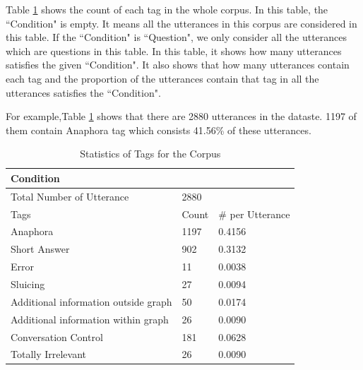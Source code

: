 \documentclass[bsc,frontabs,twoside,singlespacing,parskip,deptreport]{infthesis}     %
\begin{document}
Table \ref{tab:ori} shows the count of each tag in the whole corpus. In this table, the ``Condition" is empty. It means all the utterances in this corpus are considered in this table. If the ``Condition" is ``Question", we only consider all the utterances which are questions in this table. In this table, it shows how many utterances satisfies the given ``Condition". It also shows that how many utterances contain each tag and the proportion of the utterances contain that tag in all the utterances satisfies the ``Condition". 

For example,Table \ref{tab:ori} shows that there are 2880 utterances in the dataste. 1197 of them contain Anaphora tag which consists 41.56\% of these utterances.

\begin{table}[]
\centering
\begin{tabular}{|l|l|l|}
\hline
Condition                            & \multicolumn{2}{l|}{}            \\ \hline
Total Number of Utterance           & \multicolumn{2}{l|}{2880}        \\ \hline
Tags                                 & Count & \# per Utterance \\ \hline
Anaphora                             & 1197  & 0.4156                   \\ \hline
Short Answer                         & 902   & 0.3132                   \\ \hline
Error                                & 11    & 0.0038                   \\ \hline
Sluicing                             & 27    & 0.0094                   \\ \hline
Additional information outside graph & 50    & 0.0174                   \\ \hline
Additional information within graph  & 26    & 0.0090                   \\ \hline
Conversation Control                 & 181   & 0.0628                   \\ \hline
Totally Irrelevant                   & 26    & 0.0090                   \\ \hline
\end{tabular}
\caption{Statistics of Tags for the Corpus }
\label{tab:ori}
\end{table}
\end{document}
